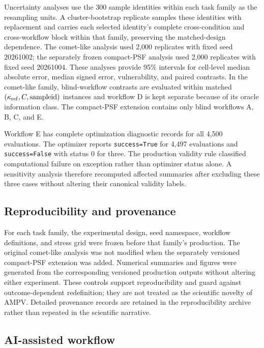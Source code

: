 Uncertainty analyses use the 300 sample identities within each task
family as the resampling units. A cluster-bootstrap replicate samples
these identities with replacement and carries each selected identity's
complete cross-condition and cross-workflow block within that family,
preserving the matched-design dependence. The comet-like analysis used
2,000 replicates with fixed seed 20261002; the separately frozen
compact-PSF analysis used 2,000 replicates with fixed seed 20261004.
These analyses provide 95\% intervals for cell-level median absolute
error, median signed error, vulnerability, and paired contrasts. In the
comet-like family, blind-workflow contrasts are evaluated within matched
\((\kappa_{\rm ref},C,\mathrm{sample\\ id})\) instances and workflow D
is kept separate because of its oracle information class. The compact-PSF
extension contains only blind workflows A, B, C, and E.

Workflow E has complete optimization diagnostic records for all 4,500
evaluations. The optimizer reports \texttt{success=True} for 4,497
evaluations and \texttt{success=False} with status 0 for three. The
production validity rule classified computational failure on exception
rather than optimizer status alone. A sensitivity analysis therefore
recomputed affected summaries after excluding these three cases without
altering their canonical validity labels.

\subsection{Reproducibility and
provenance}\label{reproducibility-and-provenance}

For each task family, the experimental design, seed namespace, workflow
definitions, and stress grid were frozen before that family's production.
The original comet-like analysis was not modified when the separately
versioned compact-PSF extension was added. Numerical summaries and figures
were generated from the corresponding versioned production outputs without
altering either experiment. These controls support reproducibility and guard
against outcome-dependent redefinition; they are not treated as the
scientific novelty of AMPV. Detailed provenance records are retained in the
reproducibility archive rather than repeated in the scientific narrative.

\subsection{AI-assisted workflow}\label{ai-assisted-workflow}

